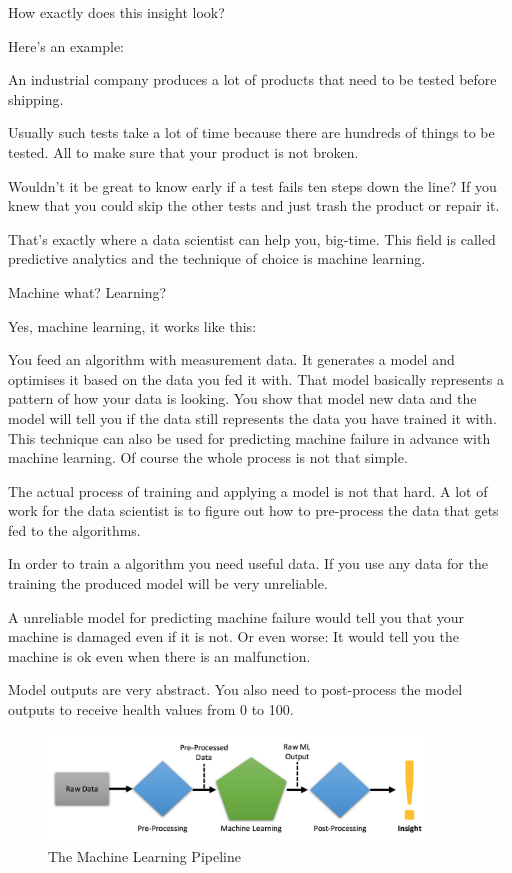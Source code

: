 \documentclass[12pt, numbers=noenddot]{scrreprt} %
\begin{document}
How exactly does this insight look?

Here’s an example:

An industrial company produces a lot of products that need to be tested before shipping.

Usually such tests take a lot of time because there are hundreds of things to be tested. All to make sure that your product is not broken.

Wouldn’t it be great to know early if a test fails ten steps down the line? If you knew that you could skip the other tests and just trash the product or repair it.

That’s exactly where a data scientist can help you, big-time. This field is called predictive analytics and the technique of choice is machine learning.

Machine what? Learning?

Yes, machine learning, it works like this:

You feed an algorithm with measurement data.
It generates a model and optimises it based on the data you fed it with. That model basically represents a pattern of how your data is looking.
You show that model new data and the model will tell you if the data still represents the data you have trained it with.
This technique can also be used for predicting machine failure in advance with machine learning. Of course the whole process is not that simple.

The actual process of training and applying a model is not that hard. A lot of work for the data scientist is to figure out how to pre-process the data that gets fed to the algorithms.

In order to train a algorithm you need useful data. If you use any data for the training the produced model will be very unreliable.

A unreliable model for predicting machine failure would tell you that your machine is damaged even if it is not. Or even worse: It would tell you the machine is ok even when there is an malfunction.

Model outputs are very abstract. You also need to post-process the model outputs to receive health values from 0 to 100.

\begin{figure}[htbp]
  \centering
     \includegraphics[width=0.9\textwidth]{images/Machine-Learning-Pipeline.png}
  \caption{The Machine Learning Pipeline}
  \label{fig:Bild1}
\end{figure}
\end{document}
